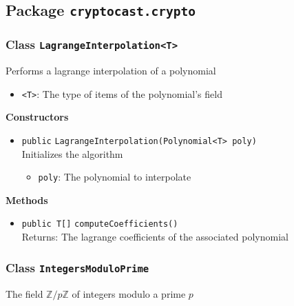 \subsection{Package \lstinline!cryptocast.crypto!}

\subsubsection{Class \lstinline|LagrangeInterpolation<T>|}
Performs a lagrange interpolation of a polynomial \\



\begin{itemize}
\item \lstinline|<T>|: The type of items of the polynomial's field
\end{itemize}


\textbf{Constructors}
\begin{itemize}
\item \lstinline|public| \lstinline|LagrangeInterpolation|\lstinline|(Polynomial<T> poly)|\\
Initializes the algorithm
\begin{itemize}
\item \lstinline|poly|: The polynomial to interpolate
\end{itemize}



\end{itemize}


\textbf{Methods}
\begin{itemize}
\item \lstinline|public T[]| \lstinline|computeCoefficients|\lstinline|()|\\
Returns: The lagrange coefficients of the associated polynomial



\end{itemize}

\subsubsection{Class \lstinline|IntegersModuloPrime|}
The field $\mathbb{Z}/p\mathbb{Z}$ of integers modulo a prime $p$ \\



